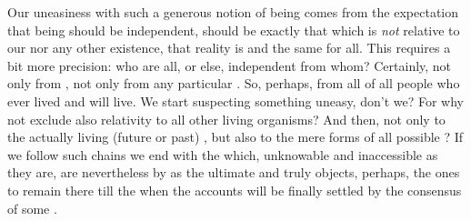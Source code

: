 \label{se:OneIs} \pa Our uneasiness with such a generous notion
of being comes from the expectation that being should be independent, should be
exactly that which is {\em not} relative to our nor any other existence, that
reality is  and the same for all. This requires a bit more precision:
who are all, or else, independent from whom? Certainly, not only from , not only from any particular . So, perhaps, from all
 of all people who ever lived and will live. We start suspecting
something uneasy, don't we? For why not exclude also relativity to all other
living organisms? And then, not only to the actually living (future or past)
, but also to the mere forms of all possible ? If
we follow such chains we end with the  which,
unknowable and inaccessible as they are, are nevertheless  by
 as the ultimate and truly  objects, perhaps, the ones
to remain there till the  when the accounts will be finally
settled by the consensus of some . 

